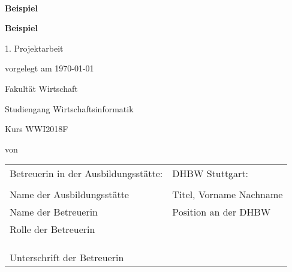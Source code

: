 \newcommand{\typMeinerArbeit}{1. Projektarbeit} 

\newcommand{\themaMeinerArbeit}{Beispiel}
\newcommand{\unterThemaMeinerArbeit}{Beispiel}

\newcommand{\autorDerArbeit}{}

\thispagestyle{empty}

\begin{spacing}{1}
\begin{center}	
~\vspace{0mm}

{\sffamily
\LARGE  
\textbf{\themaMeinerArbeit}

\bigskip
\textbf{\unterThemaMeinerArbeit}
}


\vspace{15mm}

{\Large \typMeinerArbeit}

\vspace{1cm}

vorgelegt am \today 

\vspace{15mm}

Fakultät Wirtschaft
\medskip

Studiengang Wirtschaftsinformatik
\medskip

Kurs WWI2018F 

\vspace{10mm}

von

\vspace{10mm}

{\large\textsc{\autorDerArbeit}}

\vspace{10mm}
\end{center}

\vfill

\begin{tabular}{ll}
Betreuerin in der Ausbildungsstätte: & DHBW Stuttgart: \\
\hspace{0.4\linewidth} & \\
Name der Ausbildungsstätte & Titel, Vorname Nachname \\
Name der Betreuerin 
& Position an der DHBW \\
Rolle der Betreuerin \\
\\
\\
\\
Unterschrift der Betreuerin \\
\end{tabular}


\vspace{1cm}

\end{spacing}

